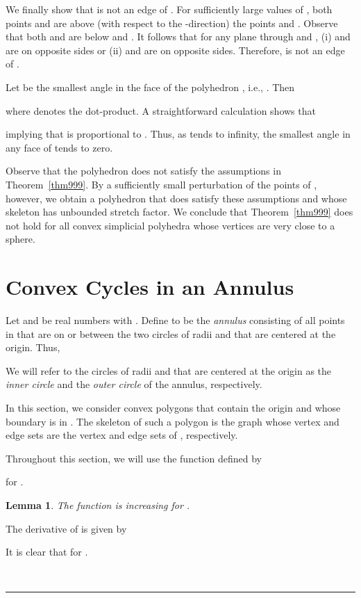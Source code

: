 \documentclass[12pt]{article}
\newtheorem{lemma}{Lemma}
\newcommand{\qed}{\rule{0.5em}{1.5ex}}
\newcommand{\fqed}{{\hfill~\qed}}
\newenvironment{proof}{{\noindent \bf Proof.}}
                      {{\hfill \fqed} \vspace{1em}}
\begin{document}
We finally show that  is not an edge of . For sufficiently 
large values of , both points  and  are above (with respect to 
the -direction) the points  and .
Observe that both  and  are below  and .
It follows that for any plane through  and , (i)  and
 are on opposite sides or (ii)  and  are on opposite sides.
Therefore,  is not an edge of .

Let  be the smallest angle in the face  of the 
polyhedron , i.e., . Then 
 
where  denotes the dot-product. A straightforward calculation 
shows that 

implying that  is proportional to . Thus, as  tends to 
infinity, the smallest angle in any face of  tends to zero.  

Observe that the polyhedron  does not satisfy the assumptions in 
Theorem~\ref{thm999}. By a sufficiently small perturbation of the points 
of , however, we obtain a polyhedron that does satisfy these 
assumptions and whose skeleton has unbounded stretch factor. We 
conclude that Theorem~\ref{thm999} does not hold for all convex 
simplicial polyhedra whose vertices are very close to a sphere. 


\section{Convex Cycles in an Annulus}  \label{secannulus} 
Let  and  be real numbers with . Define  to be 
the \emph{annulus} consisting of all points in  that are on or 
between the two circles of radii  and  that are centered at the 
origin. Thus,  
  
We will refer to the circles of radii  and  that are centered at 
the origin as the \emph{inner circle} and the \emph{outer circle} of the 
annulus, respectively. 

In this section, we consider convex polygons  that contain the origin 
and whose boundary is in . The skeleton  of such 
a polygon is the graph whose vertex and edge sets are the vertex 
and edge sets of , respectively. 

Throughout this section, we will use the function  defined by 

for .  

\begin{lemma}    \label{lemfincr}
The function  is increasing for . 
\end{lemma} 
\begin{proof}
The derivative of  is given by 
 
It is clear that  for . 
\end{proof}  
\end{document}
